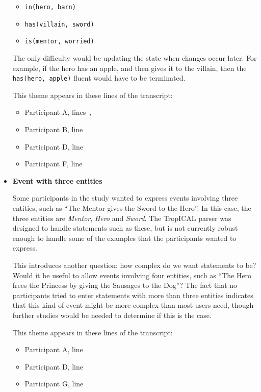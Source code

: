\documentclass[11pt]{report}
\begin{document}
\begin{itemize}
  \begin{itemize}
    \item \texttt{in(hero, barn)}
    \item \texttt{has(villain, sword)}
    \item \texttt{is(mentor, worried)}
  \end{itemize}

  The only difficulty would be updating the state when changes occur later. For
  example, if the hero has an apple, and then gives it to the villain, then the
  \texttt{has(hero, apple)} fluent would have to be terminated.

  This theme appears in these lines of the transcript:

\begin{itemize}
\item Participant A, lines~,~~
\item Participant B, line~
\item Participant D, line~
\item Participant F, line~
\end{itemize}

\item \textbf{Event with three entities}

Some participants in the study wanted to express events involving three
entities, such as ``The Mentor gives the Sword to the Hero''. In this case, the
three entities are \emph{Mentor}, \emph{Hero} and \emph{Sword}. The TropICAL
parser was designed to handle statements such as these, but is not currently
robust enough to handle some of the examples that the participants wanted to express.

This introduces another question: how complex do we want statements to be? Would
it be useful to allow events involving four entities, such as ``The Hero frees
the Princess by giving the Sausages to the Dog''? The fact that no participants
tried to enter statements with more than three entities indicates that this kind
of event might be more complex than most users need, though further studies
would be needed to determine if this is the case.

  This theme appears in these lines of the transcript:

\begin{itemize}
\item Participant A, line~
\item Participant D, line~
\item Participant G, line~
\end{itemize}


\end{itemize}
\end{document}
